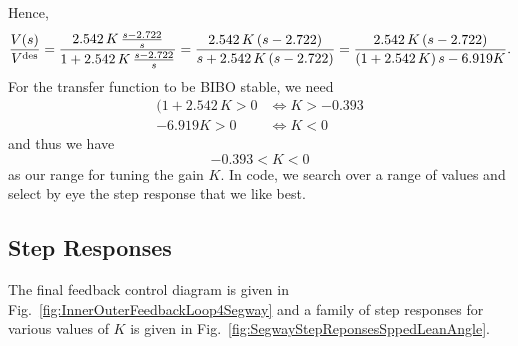 Hence, 
\begin{equation}
    \label{eq:SimplifiedSpeedLoopC}
    \frac{V(s)}{V^{\rm des}} = \frac{2.542 \, K  \,\frac{s-2.722}{s}}{1+ 2.542 \, K  \,\frac{s-2.722}{s}} = \frac{2.542 \, K  \, (s-2.722)}{s + 2.542 \, K  \, (s-2.722)} =  \frac{2.542 \, K  \, (s-2.722)}{\left(1  + 2.542 \, K  \right)s - 6.919 K}.
\end{equation}
For the transfer function to be BIBO stable, we need
\begin{equation}
    \begin{aligned}
        (1  + 2.542 \, K > 0 & \iff K > -0.393 \\[1em]
        - 6.919 K > 0 & \iff K < 0
    \end{aligned}
\end{equation}
and thus we have
\begin{equation}
    -0.393 < K < 0
\end{equation}
as our range for tuning the gain $K$. In code, we search over a range of values and select by eye the step response that we like best.





\subsection*{Step Responses}

 The final feedback control diagram is given in Fig.~\ref{fig:InnerOuterFeedbackLoop4Segway} and a family of step responses for various values of $K$ is given in Fig.~\ref{fig:SegwayStepReponsesSppedLeanAngle}.


